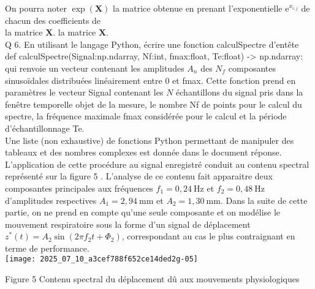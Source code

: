 On pourra noter $\exp (\mathbf{X})$ la matrice obtenue en prenant l'exponentielle $\mathrm{e}^{x_{i, j}}$ de chacun des coefficients de\\
la matrice $\mathbf{X}$. la matrice $\mathbf{X}$.\\
Q 6. En utilisant le langage Python, écrire une fonction calculSpectre d'entête\\
def calculSpectre(Signal:np.ndarray, Nf:int, fmax:float, Te:float) -> np.ndarray:\\
qui renvoie un vecteur contenant les amplitudes $A_{n}$ des $N_{f}$ composantes sinusoïdales distribuées linéairement entre 0 et fmax. Cette fonction prend en paramètres le vecteur Signal contenant les $N$ échantillons du signal pris dans la fenêtre temporelle objet de la mesure, le nombre Nf de points pour le calcul du spectre, la fréquence maximale fmax considérée pour le calcul et la période d'échantillonnage Te.\\
Une liste (non exhaustive) de fonctions Python permettant de manipuler des tableaux et des nombres complexes est donnée dans le document réponse.\\
L'application de cette procédure au signal enregistré conduit au contenu spectral représenté sur la figure 5 . L'analyse de ce contenu fait apparaitre deux composantes principales aux fréquences $f_{1}=0,24 \mathrm{~Hz}$ et $f_{2}=0,48 \mathrm{~Hz}$ d'amplitudes respectives $A_{1}=2,94 \mathrm{~mm}$ et $A_{2}=1,30 \mathrm{~mm}$. Dans la suite de cette partie, on ne prend en compte qu'une seule composante et on modélise le mouvement respiratoire sous la forme d'un signal de déplacement $z^{*}(t)=A_{2} \sin \left(2 \pi f_{2} t+\Phi_{2}\right)$, correspondant au cas le plus contraignant en terme de performance.\\
\texttt{[image: 2025\_07\_10\_a3cef788f652ce14ded2g-05]}

Figure 5 Contenu spectral du déplacement dû aux mouvements physiologiques
